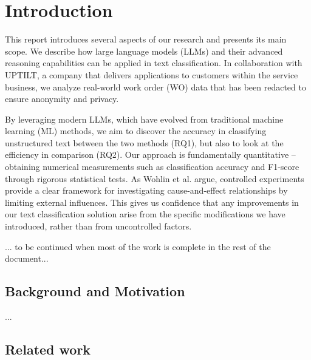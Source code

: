 \section{Introduction}

This report introduces several aspects of our research and presents its main scope. We describe how large language models (LLMs) and their advanced reasoning capabilities can be applied in text classification. In collaboration with UPTILT, a company that delivers applications to customers within the service business, we analyze real-world work order (WO) data that has been redacted to ensure anonymity and privacy.

By leveraging modern LLMs, which have evolved from traditional machine learning (ML) methods, we aim to discover the accuracy in classifying unstructured text between the two methods (RQ1), but also to look at the efficiency in comparison (RQ2). Our approach is fundamentally quantitative -- obtaining numerical measurements such as classification accuracy and F1-score through rigorous statistical tests. As Wohlin et al. \cite{wohlin2000software} argue, controlled experiments provide a clear framework for investigating cause-and-effect relationships by limiting external influences. This gives us confidence that any improvements in our text classification solution arise from the specific modifications we have introduced, rather than from uncontrolled factors.

... to be continued when most of the work is complete in the rest of the document...

\subsection{Background and Motivation}

...

\subsection{Related work}




